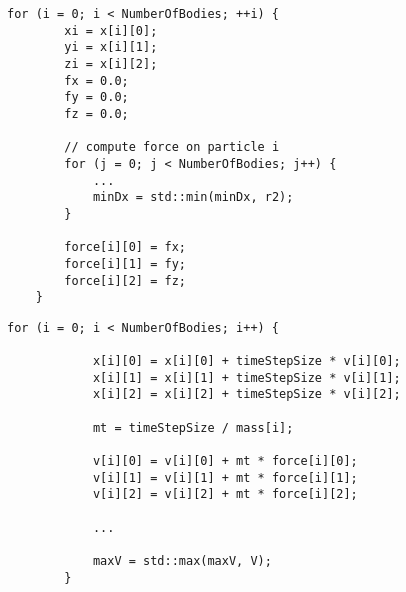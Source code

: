 \documentclass[11pt]{article}
\begin{document}
\begin{lstlisting}[style=CStyle]
    for (i = 0; i < NumberOfBodies; ++i) {
        xi = x[i][0];
        yi = x[i][1];
        zi = x[i][2];
        fx = 0.0;
        fy = 0.0;
        fz = 0.0;

        // compute force on particle i
        for (j = 0; j < NumberOfBodies; j++) {
            ...
            minDx = std::min(minDx, r2);
        }

        force[i][0] = fx;
        force[i][1] = fy;
        force[i][2] = fz;
    }
    \end{lstlisting}
    \begin{lstlisting}[style=CStyle]
        for (i = 0; i < NumberOfBodies; i++) {
    
            x[i][0] = x[i][0] + timeStepSize * v[i][0];
            x[i][1] = x[i][1] + timeStepSize * v[i][1];
            x[i][2] = x[i][2] + timeStepSize * v[i][2];
    
            mt = timeStepSize / mass[i];
    
            v[i][0] = v[i][0] + mt * force[i][0];
            v[i][1] = v[i][1] + mt * force[i][1];
            v[i][2] = v[i][2] + mt * force[i][2];
    
            ...
    
            maxV = std::max(maxV, V);
        }
        \end{lstlisting}
\end{document}

